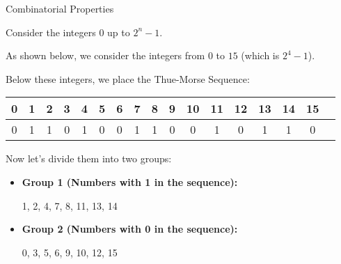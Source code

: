 \documentclass{beamer}
\begin{document}
\begin{frame}{Combinatorial Properties}

    Consider the integers \( 0 \) up to \( 2^n-1 \).
    
    As shown below, we consider the integers from \( 0 \) to \( 15 \) (which is \( 2^4-1 \)).
    
    Below these integers, we place the Thue-Morse Sequence:
    
    \begin{center}
        \begin{tabular}{c c c c c c c c c c c c c c c c c}
        0 & 1 & 2 & 3 & 4 & 5 & 6 & 7 & 8 & 9 & 10 & 11 & 12 & 13 & 14 & 15 \\
        \hline
        0 & 1 & 1 & 0 & 1 & 0 & 0 & 1 & 1 & 0 & 0 & 1 & 0 & 1 & 1 & 0 \\
        \end{tabular}
    \end{center}
    
    Now let's divide them into two groups:
    
    \begin{itemize}
        \item \textbf{Group 1 (Numbers with 1 in the sequence):}
        \begin{center}
        1, 2, 4, 7, 8, 11, 13, 14
        \end{center}
        \item \textbf{Group 2 (Numbers with 0 in the sequence):}
        \begin{center}
        0, 3, 5, 6, 9, 10, 12, 15
        \end{center}
    \end{itemize}

\end{frame}


\begin{frame}
\end{frame}

\begin{frame}
\end{frame}

\begin{frame}
\end{frame}
\end{document}

